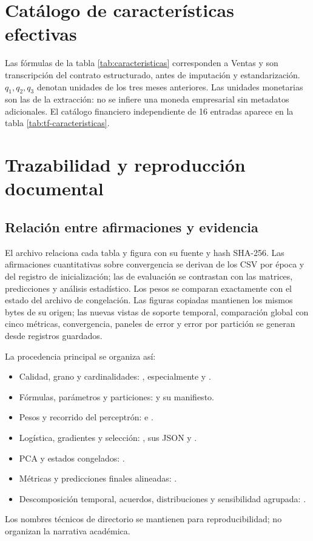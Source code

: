 \section{Catálogo de características efectivas}\label{sec:catalogo}
Las fórmulas de la tabla \ref{tab:caracteristicas} corresponden a Ventas y son transcripción del contrato estructurado, antes de imputación y estandarización. $q_1,q_2,q_3$ denotan unidades de los tres meses anteriores. Las unidades monetarias son las de la extracción: no se infiere una moneda empresarial sin metadatos adicionales. El catálogo financiero independiente de 16 entradas aparece en la tabla \ref{tab:tf-caracteristicas}.
\begingroup\small

\endgroup

\section{Trazabilidad y reproducción documental}
\subsection{Relación entre afirmaciones y evidencia}
El archivo  relaciona cada tabla y figura con su fuente y hash SHA-256. Las afirmaciones cuantitativas sobre convergencia se derivan de los CSV por época y del registro de inicialización; las de evaluación se contrastan con las matrices, predicciones y análisis estadístico. Los pesos se comparan exactamente con el estado del archivo de congelación. Las figuras copiadas mantienen los mismos bytes de su origen; las nuevas vistas de soporte temporal, comparación global con cinco métricas, convergencia, paneles de error y error por partición se generan desde registros guardados.

La procedencia principal se organiza así:
\begin{itemize}
\item Calidad, grano y cardinalidades: , especialmente  y .
\item Fórmulas, parámetros y particiones:  y su manifiesto.
\item Pesos y recorrido del perceptrón:  e .
\item Logística, gradientes y selección: , sus JSON y .
\item PCA y estados congelados: .
\item Métricas y predicciones finales alineadas: .
\item Descomposición temporal, acuerdos, distribuciones y sensibilidad agrupada: .
\end{itemize}
Los nombres técnicos de directorio se mantienen para reproducibilidad; no organizan la narrativa académica.

